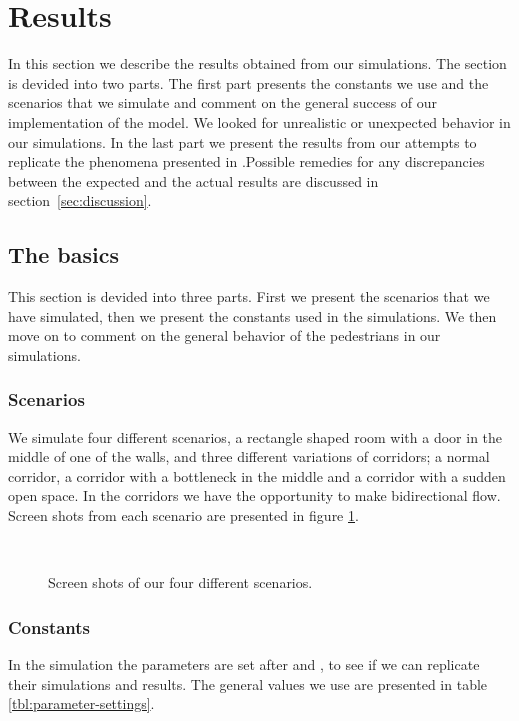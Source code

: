 \section{Results}
\label{sec:results}
In this section we describe the results obtained from our simulations.
The section is devided into two parts. The first part presents the 
constants we use and the scenarios that we simulate and comment on 
the general success of our implementation of the model. We looked 
for unrealistic or unexpected behavior in our simulations. In the 
last part we present the results from our attempts to replicate 
the phenomena presented in \cite{self-org}.Possible remedies for 
any discrepancies between the expected and the actual results are 
discussed in section~\ref{sec:discussion}.

\subsection{The basics}
This section is devided into three parts. First we present the 
scenarios that we have simulated, then we present the constants 
used in the simulations. We then move on to comment on the 
general behavior of the pedestrians in our simulations.

\subsubsection{Scenarios}
We simulate four different scenarios, a rectangle shaped room with a 
door in the middle of one of the walls, and three different variations 
of corridors; a normal corridor, a corridor with a bottleneck in the 
middle and a corridor with a sudden open space. In the corridors we have 
the opportunity to make bidirectional flow. Screen shots from each 
scenario are presented in figure \ref{fig:fourcases}.

\begin{figure}[h]
\centering
{}
\subfloat[Bottleneck.]{\resizebox{7cm}{!}{}}\\
\subfloat[Corridor.]{\resizebox{7cm}{!}{}}
\caption{Screen shots of our four different scenarios.}
\label{fig:fourcases}
\end{figure}

\subsubsection{Constants}
In the simulation the parameters are set after \cite{ABconstant} and 
\cite{self-org}, to see if we can replicate their simulations and results. 
The general values we use are presented in table \ref{tbl:parameter-settings}.


